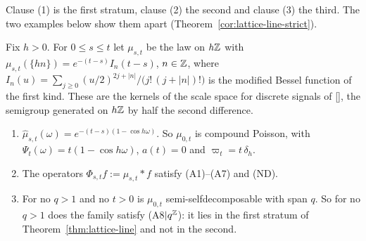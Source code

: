 Clause (1) is the first stratum, clause (2) the second and clause (3) the third. The two examples
below show them apart (Theorem~\ref{cor:lattice-line-strict}).

\begin{proposition}
\label{prop:lindeberg-stratum-one}

Fix $h > 0$. For $0 \le s \le t$ let $\mu_{s,t}$ be the law on $h\mathbb{Z}$ with
$\mu_{s,t}(\{hn\}) = e^{-(t-s)}I_n(t-s)$, $n \in \mathbb{Z}$, where
$I_n(u) = \sum_{j \ge 0}(u/2)^{2j+|n|}/\bigl(j!\,(j+|n|)!\bigr)$ is the modified Bessel function of
the first kind. These are the kernels of the scale space for discrete signals of
[], the semigroup generated on $h\mathbb{Z}$ by half the second difference.
\begin{enumerate}
\item $\widehat\mu_{s,t}(\omega) = e^{-(t-s)(1 - \cos h\omega)}$. So $\mu_{0,t}$ is compound
Poisson, with $\Psi_t(\omega) = t(1 - \cos h\omega)$, $a(t) = 0$ and $\varpi_t = t\,\delta_h$.
\item The operators $\Phi_{s,t}f := \mu_{s,t} * f$ satisfy (A1)--(A7) and (ND).
\item For no $q > 1$ and no $t > 0$ is $\mu_{0,t}$ semi-selfdecomposable with span $q$. So for no
$q > 1$ does the family satisfy (A8$|q^{\mathbb{Z}}$): it lies in the first stratum of
Theorem~\ref{thm:lattice-line} and not in the second.
\end{enumerate}
\end{proposition}

